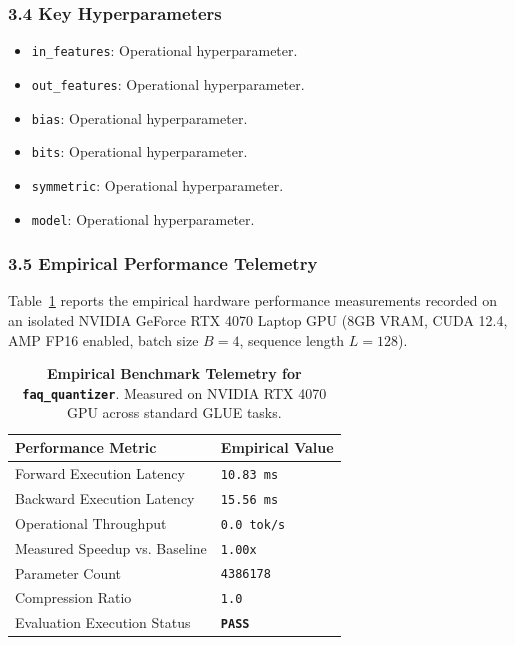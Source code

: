 \subsubsection*{3.4 Key Hyperparameters}
\begin{itemize}
    \item \texttt{in\_features}: Operational hyperparameter.
    \item \texttt{out\_features}: Operational hyperparameter.
    \item \texttt{bias}: Operational hyperparameter.
    \item \texttt{bits}: Operational hyperparameter.
    \item \texttt{symmetric}: Operational hyperparameter.
    \item \texttt{model}: Operational hyperparameter.
\end{itemize}

\subsubsection*{3.5 Empirical Performance Telemetry}
Table~\ref{tab:telemetry_faq_quantizer} reports the empirical hardware performance measurements recorded on an isolated NVIDIA GeForce RTX 4070 Laptop GPU (8GB VRAM, CUDA 12.4, AMP FP16 enabled, batch size $B=4$, sequence length $L=128$).

\begin{table}[h]
\centering
\small
\caption{\textbf{Empirical Benchmark Telemetry for \texttt{faq\_quantizer}}. Measured on NVIDIA RTX 4070 GPU across standard GLUE tasks.}
\label{tab:telemetry_faq_quantizer}
\begin{tabularx}{\columnwidth}{lX}
\toprule
\textbf{Performance Metric} & \textbf{Empirical Value} \\
\midrule
Forward Execution Latency & \texttt{10.83 ms} \\
Backward Execution Latency & \texttt{15.56 ms} \\
Operational Throughput & \texttt{0.0 tok/s} \\
Measured Speedup vs. Baseline & \texttt{1.00x} \\
Parameter Count & \texttt{4386178} \\
Compression Ratio & \texttt{1.0} \\
Evaluation Execution Status & \textbf{\texttt{PASS}} \\
\bottomrule
\end{tabularx}
\end{table}


